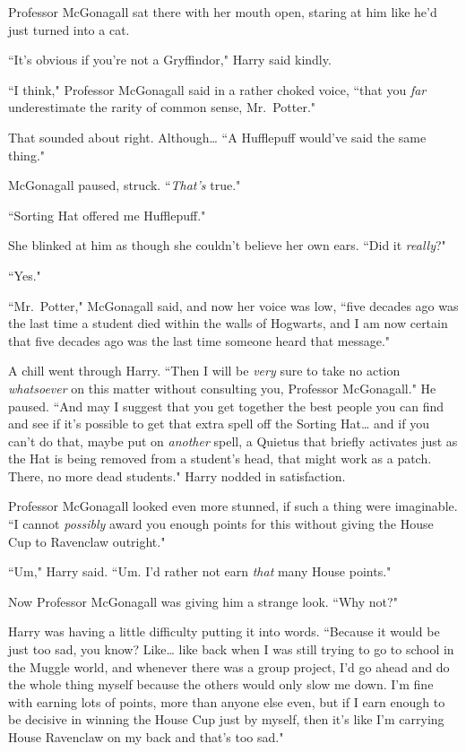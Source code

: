 Professor McGonagall sat there with her mouth open, staring at him like he'd just turned into a cat.

``It's obvious if you're not a Gryffindor," Harry said kindly.

``I think," Professor McGonagall said in a rather choked voice, ``that you \emph{far} underestimate the rarity of common sense, Mr.~Potter."

That sounded about right. Although{\ldots} ``A Hufflepuff would've said the same thing."

McGonagall paused, struck. ``\emph{That's} true."

``Sorting Hat offered me Hufflepuff."

She blinked at him as though she couldn't believe her own ears. ``Did it \emph{really}?"

``Yes."

``Mr.~Potter," McGonagall said, and now her voice was low, ``five decades ago was the last time a student died within the walls of Hogwarts, and I am now certain that five decades ago was the last time someone heard that message."

A chill went through Harry. ``Then I will be \emph{very} sure to take no action \emph{whatsoever} on this matter without consulting you, Professor McGonagall." He paused. ``And may I suggest that you get together the best people you can find and see if it's possible to get that extra spell off the Sorting Hat{\ldots} and if you can't do that, maybe put on \emph{another} spell, a Quietus that briefly activates just as the Hat is being removed from a student's head, that might work as a patch. There, no more dead students." Harry nodded in satisfaction.

Professor McGonagall looked even more stunned, if such a thing were imaginable. ``I cannot \emph{possibly} award you enough points for this without giving the House Cup to Ravenclaw outright."

``Um," Harry said. ``Um. I'd rather not earn \emph{that} many House points."

Now Professor McGonagall was giving him a strange look. ``Why not?"

Harry was having a little difficulty putting it into words. ``Because it would be just too sad, you know? Like{\ldots} like back when I was still trying to go to school in the Muggle world, and whenever there was a group project, I'd go ahead and do the whole thing myself because the others would only slow me down. I'm fine with earning lots of points, more than anyone else even, but if I earn enough to be decisive in winning the House Cup just by myself, then it's like I'm carrying House Ravenclaw on my back and that's too sad."

